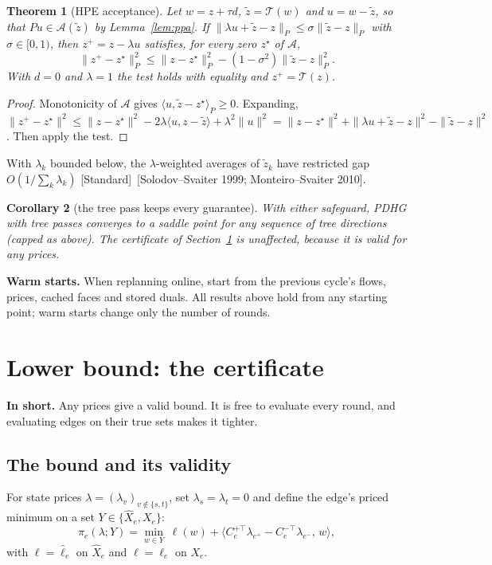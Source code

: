 \documentclass[11pt]{article}
\newcommand{\inshort}[1]{\par\noindent\textcolor{accent}{\textbf{In short.}} #1\par\smallskip}
\newcommand{\std}{\textcolor{muted}{[Standard]}\ }
\theoremstyle{plain}
\newtheorem{theorem}{Theorem}[section]
\newtheorem{corollary}[theorem]{Corollary}
\theoremstyle{definition}
\theoremstyle{remark}
\begin{document}
\begin{theorem}[HPE acceptance]\label{thm:hpe}
Let $w=z+\tau d$, $\tilde z=\mathcal T(w)$ and $u=w-\tilde z$, so that $Pu\in\mathcal A(\tilde z)$ by Lemma~\ref{lem:ppa}. If $\|\lambda u+\tilde z-z\|_P\le\sigma\|\tilde z-z\|_P$ with $\sigma\in[0,1)$, then $z^+=z-\lambda u$ satisfies, for every zero $z^\star$ of $\mathcal A$,
\[
\|z^+-z^\star\|_P^2\le\|z-z^\star\|_P^2-(1-\sigma^2)\|\tilde z-z\|_P^2 .
\]
With $d=0$ and $\lambda=1$ the test holds with equality and $z^+=\mathcal T(z)$.
\end{theorem}
\begin{proof}
Monotonicity of $\mathcal A$ gives $\langle u,\tilde z-z^\star\rangle_P\ge0$. Expanding, $\|z^+-z^\star\|^2\le\|z-z^\star\|^2-2\lambda\langle u,z-\tilde z\rangle+\lambda^2\|u\|^2=\|z-z^\star\|^2+\|\lambda u+\tilde z-z\|^2-\|\tilde z-z\|^2$. Then apply the test.
\end{proof}
With $\lambda_k$ bounded below, the $\lambda$-weighted averages of $\tilde z_k$ have restricted gap $O(1/\sum_k\lambda_k)$ \std[Solodov--Svaiter 1999; Monteiro--Svaiter 2010].

\begin{corollary}[the tree pass keeps every guarantee]\label{cor:treesafe}
With either safeguard, PDHG with tree passes converges to a saddle point for any sequence of tree directions (capped as above). The certificate of Section~\ref{sec:lower} is unaffected, because it is valid for any prices.
\end{corollary}

\textbf{Warm starts.} When replanning online, start from the previous cycle's flows, prices, cached faces and stored duals. All results above hold from any starting point; warm starts change only the number of rounds.

\section{Lower bound: the certificate}\label{sec:lower}
\inshort{Any prices give a valid bound. It is free to evaluate every round, and evaluating edges on their true sets makes it tighter.}

\subsection{The bound and its validity}
For state prices $\lambda=(\lambda_v)_{v\notin\{s,t\}}$, set $\lambda_s=\lambda_t=0$ and define the edge's priced minimum on a set $Y\in\{\hat X_e,X_e\}$:
\[
\pi_e(\lambda;Y)=\min_{w\in Y}\ \ell(w)+\big\langle C_e^{+\top}\lambda_{e^+}-C_e^{-\top}\lambda_{e^-},\,w\big\rangle,
\]
with $\ell=\hat\ell_e$ on $\hat X_e$ and $\ell=\ell_e$ on $X_e$.
\end{document}
